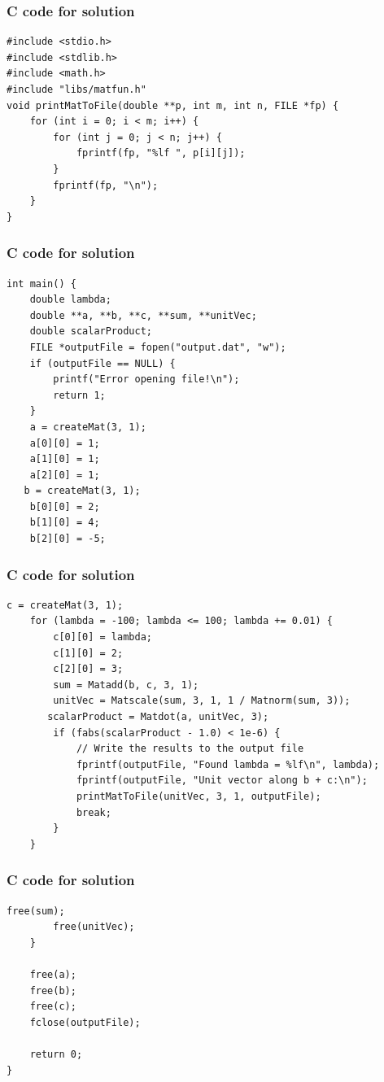 \documentclass{beamer}
\begin{document}
\begin{frame}[fragile]
\frametitle{C code for solution}
\begin{lstlisting}[style=Cstyle]
#include <stdio.h>
#include <stdlib.h>
#include <math.h>
#include "libs/matfun.h"
void printMatToFile(double **p, int m, int n, FILE *fp) {
    for (int i = 0; i < m; i++) {
        for (int j = 0; j < n; j++) {
            fprintf(fp, "%lf ", p[i][j]);
        }
        fprintf(fp, "\n");
    }
}

\end{lstlisting}
\end{frame}

\begin{frame}[fragile]
\frametitle{C code for solution}
\begin{lstlisting}[style=Cstyle]
   int main() {
    double lambda;
    double **a, **b, **c, **sum, **unitVec;
    double scalarProduct;
    FILE *outputFile = fopen("output.dat", "w");
    if (outputFile == NULL) {
        printf("Error opening file!\n");
        return 1;
    }
    a = createMat(3, 1);
    a[0][0] = 1;
    a[1][0] = 1;
    a[2][0] = 1;
   b = createMat(3, 1);
    b[0][0] = 2;
    b[1][0] = 4;
    b[2][0] = -5;
\end{lstlisting}
\end{frame}

\begin{frame}[fragile]
\frametitle{C code for solution}
\begin{lstlisting}[style=Cstyle]
 c = createMat(3, 1);
    for (lambda = -100; lambda <= 100; lambda += 0.01) {
        c[0][0] = lambda;
        c[1][0] = 2;
        c[2][0] = 3;
        sum = Matadd(b, c, 3, 1);
        unitVec = Matscale(sum, 3, 1, 1 / Matnorm(sum, 3));
       scalarProduct = Matdot(a, unitVec, 3);
        if (fabs(scalarProduct - 1.0) < 1e-6) {
            // Write the results to the output file
            fprintf(outputFile, "Found lambda = %lf\n", lambda);
            fprintf(outputFile, "Unit vector along b + c:\n");
            printMatToFile(unitVec, 3, 1, outputFile);
            break;
        }
    }

\end{lstlisting}
\end{frame}

\begin{frame}[fragile]
\frametitle{C code for solution}
\begin{lstlisting}[style=Cstyle]
        free(sum);
        free(unitVec);
    }

    free(a);
    free(b);
    free(c);
    fclose(outputFile);

    return 0;
}
\end{lstlisting}
\end{frame}
\end{document}
